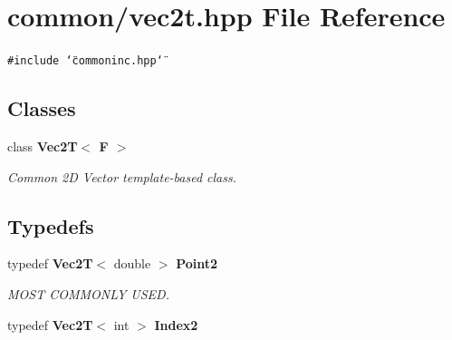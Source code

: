 \section{common/vec2t.hpp File Reference}
\label{vec2t_8hpp}


{\tt \#include \char`\"{}commoninc.hpp\char`\"{}}\par
\subsection*{Classes}
\begin{CompactItemize}
\item 
class {\bf Vec2T$<$ F $>$}
\begin{CompactList}\small\item\em Common 2D Vector template-based class. \item\end{CompactList}\end{CompactItemize}
\subsection*{Typedefs}
\begin{CompactItemize}
\item 
typedef {\bf Vec2T}$<$ double $>$ {\bf Point2}
\begin{CompactList}\small\item\em MOST COMMONLY USED. \item\end{CompactList}\item 
typedef {\bf Vec2T}$<$ int $>$ {\bf Index2}
\end{CompactItemize}
